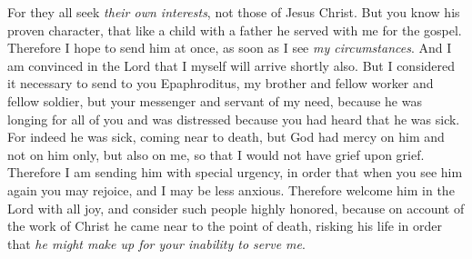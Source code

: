 \begin{biblechapter}
\verse For they all seek \textit{their own interests}, not those of Jesus Christ.
\verse But you know his proven character, that like a child with a father he served with me for the gospel.
\verse Therefore I hope to send him at once, as soon as I see \textit{my circumstances}.
\verse And I am convinced in the Lord that I myself will arrive shortly also.
 But I considered it necessary to send to you Epaphroditus, my brother and fellow worker and fellow soldier, but your messenger and servant of my need,
\verse because he was longing for all of you and was distressed because you had heard that he was sick.
\verse For indeed he was sick, coming near to death, but God had mercy on him and not on him only, but also on me, so that I would not have grief upon grief.
\verse Therefore I am sending him with special urgency, in order that when you see him again you may rejoice, and I may be less anxious.
\verse Therefore welcome him in the Lord with all joy, and consider such people highly honored,
\verse because on account of the work of Christ he came near to the point of death, risking his life in order that \textit{he might make up for your inability to serve me}.
\end{biblechapter}

